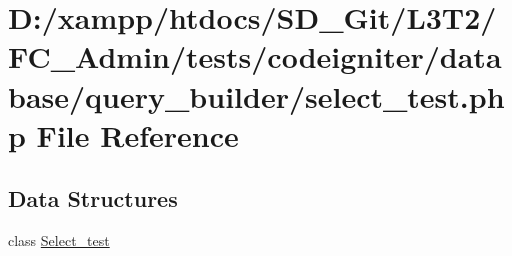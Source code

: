 \hypertarget{_admin_2tests_2codeigniter_2database_2query__builder_2select__test_8php}{}\section{D\+:/xampp/htdocs/\+S\+D\+\_\+\+Git/\+L3\+T2/\+F\+C\+\_\+\+Admin/tests/codeigniter/database/query\+\_\+builder/select\+\_\+test.php File Reference}
\label{_admin_2tests_2codeigniter_2database_2query__builder_2select__test_8php}
\subsection*{Data Structures}
\begin{DoxyCompactItemize}
\item 
class \hyperlink{class_select__test}{Select\+\_\+test}
\end{DoxyCompactItemize}
